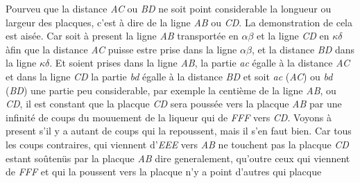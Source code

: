 \textit{}\textit{}\textit{}\linebreak {}\textit{}\textit{}\textso{, }\textit{}\textit{}\textit{}\textit{} Pourveu que la distance \textit{AC} ou \textit{BD} ne soit point considerable  la longueur ou largeur des placques, c'est \`{a} dire de la ligne \textit{AB} ou \textit{CD}. La demonstration de cela est ais\'{e}e. Car soit \`{a} present la ligne \textit{AB} transport\'{e}e en $\alpha\beta$ et la ligne \textit{CD} en $\kappa\delta$ \`{a}fin que la distance \textit{AC} puisse estre prise dans la ligne $\alpha\beta$, et la distance \textit{BD} dans la ligne $\kappa\delta$. Et soient prises dans la ligne \textit{AB}, la partie \textit{ac} \'{e}galle \`{a} la distance \textit{AC} et dans la ligne \textit{CD} la partie \textit{bd} \'{e}galle \`{a} la distance \textit{BD} et soit \textit{ac} (\textit{AC}) ou \textit{bd} (\textit{BD}) une partie peu considerable, par exemple la centi\`{e}me de la ligne \textit{AB}, ou \textit{CD}, il est constant que la placque \textit{CD} sera pouss\'{e}e vers la placque \textit{AB} par une infinit\'{e} de coups du mouuement de la liqueur qui  de \textit{FFF} vers \textit{CD}. Voyons \`{a} present s'il y a autant de coups qui la repoussent, mais il s'en faut bien. Car tous les coups contraires, qui viennent d'\textit{EEE} vers \textit{AB} ne touchent pas la placque \textit{CD} estant so\^{u}ten\"{u}s par la placque  \textit{AB}  dire generalement, qu'outre ceux qui viennent de \textit{FFF} et qui la poussent vers la placque  n'y a point d'autres qui  placque 
